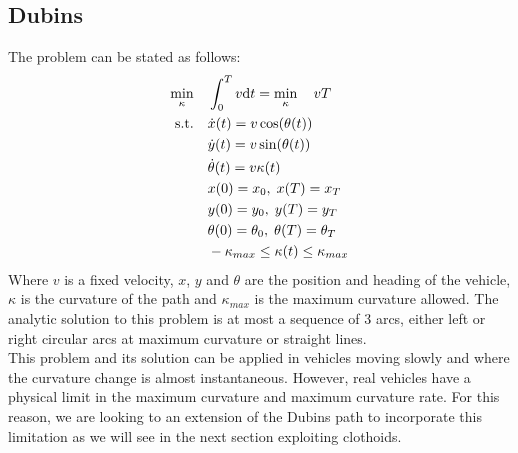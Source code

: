 \documentclass[11pt,twocolumn]{scrartcl}
\begin{document}
\subsection*{Dubins}
The problem can be stated as follows:
%
\begin{equation}
  \begin{split}
    \min_{\kappa}  \quad & \int_0^T v \differential t = \min_{\kappa}  \quad v T \\ %
    \text{s.t.} \quad 
      &\dot{x}(t)      = v \cos(\theta(t)) \\
      &\dot{y}(t)      = v \sin(\theta(t)) \\
      &\dot{\theta}(t) = v \kappa(t)       \\
      &x(0)      = x_0,      \; x(T)      = x_T\\
      &y(0)      = y_0,      \; y(T)      = y_T\\
      &\theta(0) = \theta_0, \; \theta(T) = \theta_T\\
      &-\kappa_{max} \le \kappa(t) \le \kappa_{max}   
  \end{split}
\end{equation}
%
Where $v$ is a fixed velocity, $x$, $y$ and $\theta$ are the position and heading of the vehicle, $\kappa$ is the curvature of the path and $\kappa_{max}$ is the maximum curvature allowed. 
The analytic solution to this problem is at most a sequence of 3 arcs, either left or right circular arcs at maximum curvature or straight lines.\cite{shkel2001classification}\\
%
This problem and its solution can be applied in vehicles moving slowly and where the curvature change is almost instantaneous. However, real vehicles have a physical limit in the maximum curvature and maximum curvature rate. For this reason, we are looking to an extension of the Dubins path to incorporate this limitation as we will see in the next section exploiting clothoids.\cite{bertolazzi2015g1,bertolazzi2018clothoids}
%
\end{document}
